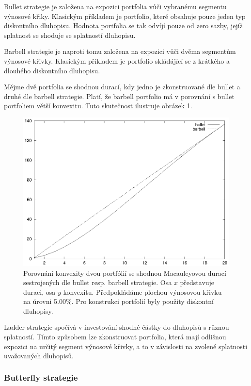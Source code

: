 \documentclass[a4paper]{book}
\begin{document}
Bullet strategie je založena na expozici portfolia vůči vybranému segmentu výnosové křiky. Klasickým příkladem je portfolio, které obsahuje pouze jeden typ diskontního dluhopisu. Hodnota portfolia se tak odvíjí pouze od zero sazby, jejíž splatnost se shoduje se splatností dluhopisu.

Barbell strategie je naproti tomu založena na expozici vůči dvěma segmentům výnosové křivky. Klasickým příkladem je portfolio skládájící se z krátkého a dlouhého diskontního dluhopisu.

Mějme dvě portfolia se shodnou durací, kdy jedno je zkonstruované dle bullet a druhé dle barbell strategie. Platí, že barbell portfolio má v porovnání s bullet portfoliem větší konvexitu. Tuto skutečnost ilustruje obrázek \ref{bullet_vs_barbell}.
\begin{figure}
  \centering
  \includegraphics[scale=0.75]{bullet_vs_barbell.eps}
  \caption{Porovnání konvexity dvou portfólií se shodnou Macauleyovou durací sestrojených dle bullet resp. barbell strategie. Osa $x$ představuje duraci, osa $y$ konvexitu. Předpokládáme plochou výnosovou křivku na úrovni 5.00\%. Pro konstrukci portfolií byly použity diskontní dluhopisy.}
  \label{bullet_vs_barbell}
\end{figure}

Ladder strategie spočívá v investování shodné částky do dluhopisů s různou splatností. Tímto způsobem lze zkonstruovat portfolia, která mají odlišnou expozici na určitý segment výnosové křivky, a to v závislosti na zvolené splatnosti uvažovaných dluhopisů.

\subsubsection{Butterfly strategie}
\end{document}
